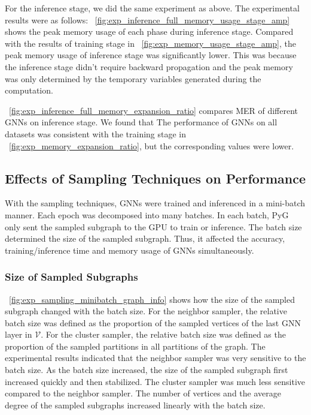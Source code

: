 For the inference stage, we did the same experiment as above. The experimental results were as follows:
%
\figurename~\ref{fig:exp_inference_full_memory_usage_stage_amp} shows the peak memory usage of each phase during inference stage.  
%
Compared with the results of training stage in \figurename~\ref{fig:exp_memory_usage_stage_amp}, the peak memory usage of inference stage was significantly lower.
%
This was because the inference stage didn't require backward propagation and the peak memory was only determined by the temporary variables generated during the computation.
%

\figurename~\ref{fig:exp_inference_full_memory_expansion_ratio} compares MER of different GNNs on inference stage. 
%
We found that The performance of GNNs on all datasets was consistent with the training stage in \figurename~\ref{fig:exp_memory_expansion_ratio}, but the corresponding values were lower.
%

%

\subsection{Effects of Sampling Techniques on Performance}
\label{sec:effects_of_sampling_techniques_on_performance}

With the sampling techniques, GNNs were trained and inferenced in a mini-batch manner.
%
Each epoch was decomposed into many batches.
%
In each batch, PyG only sent the sampled subgraph to the GPU to train or inference.
%
The batch size determined the size of the sampled subgraph.
%
Thus, it affected the accuracy, training/inference time and memory usage of GNNs simultaneously.

\subsubsection{Size of Sampled Subgraphs}

\figurename~\ref{fig:exp_sampling_minibatch_graph_info} shows how the size of the sampled subgraph changed with the batch size.
%
For the neighbor sampler, the relative batch size was defined as the proportion of the sampled vertices of the last GNN layer in $\mathcal{V}$.
%
For the cluster sampler, the relative batch size was defined as the proportion of the sampled partitions in all partitions of the graph.
%
The experimental results indicated that the neighbor sampler was very sensitive to the batch size.
%
As the batch size increased, the size of the sampled subgraph first increased quickly and then stabilized.
%
The cluster sampler was much less sensitive compared to the neighbor sampler.
%
The number of vertices and the average degree of the sampled subgraphs increased linearly with the batch size.


